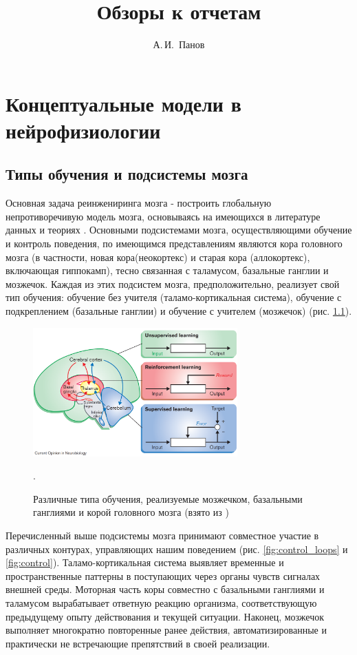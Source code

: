 \documentclass[12pt]{report}
\title{Обзоры к отчетам}
\author{А.\,И.~Панов}
\begin{document}
	\chapter{Концептуальные модели в нейрофизиологии}
	\section{Типы обучения и подсистемы мозга}
	
	Основная задача реинжениринга мозга - построить глобальную непротиворечивую модель мозга, основываясь на имеющихся в литературе данных и теориях \cite{Shumsky2015b}. Основными подсистемами мозга, осуществляющими обучение и контроль поведения, по имеющимся представлениям являются кора головного мозга (в частности, новая кора(неокортекс) и старая кора (аллокортекс), включающая гиппокамп), тесно связанная с таламусом, базальные ганглии и мозжечок. Каждая из этих подсистем мозга, предположительно, реализует свой тип обучения: обучение без учителя (таламо-кортикальная система), обучение с подкреплением (базальные ганглии) и обучение с учителем (мозжечок) \cite{Doya2000a} (рис. \ref{fig:doya_schema}).
	\begin{figure}[h]
		\centering
		\includegraphics[width=0.7\textwidth]{misc/phisio/doya_schema}
		\caption{Различные типа обучения, реализуемые мозжечком, базальными ганглиями и корой головного мозга (взято из \cite{Doya2000a})}.
		\label{fig:doya_schema}		
	\end{figure}

	Перечисленный выше подсистемы мозга принимают совместное участие в различных контурах, управляющих нашим поведением \cite{Shumsky2015b} (рис. \ref{fig:control_loops} и \ref{fig:control}). Таламо-кортикальная система выявляет временные и пространственные паттерны в поступающих через органы чувств сигналах внешней среды. Моторная часть коры совместно с базальными ганглиями и таламусом вырабатывает ответную реакцию организма, соответствующую предыдущему опыту действования и текущей ситуации. Наконец, мозжечок выполняет многократно повторенные ранее действия, автоматизированные и практически не встречающие препятствий в своей реализации.
	
\end{document}
